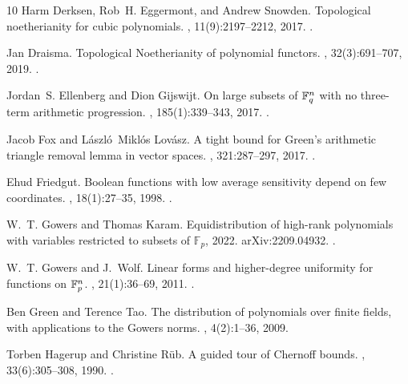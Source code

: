 \begin{thebibliography}{10}
Harm Derksen, Rob~H. Eggermont, and Andrew Snowden.
\newblock Topological noetherianity for cubic polynomials.
, 11(9):2197--2212, 2017.
\newblock \href {https://doi.org/10.2140/ant.2017.11.2197} {}.

Jan Draisma.
\newblock Topological {N}oetherianity of polynomial functors.
, 32(3):691--707, 2019.
\newblock \href {https://doi.org/10.1090/jams/923} {}.

Jordan~S. Ellenberg and Dion Gijswijt.
\newblock On large subsets of {$\Bbb F^n_q$} with no three-term arithmetic progression.
, 185(1):339--343, 2017.
\newblock \href {https://doi.org/10.4007/annals.2017.185.1.8} {}.

Jacob Fox and L\'{a}szl\'{o}~Mikl\'{o}s Lov\'{a}sz.
\newblock A tight bound for {G}reen's arithmetic triangle removal lemma in vector spaces.
, 321:287--297, 2017.
\newblock \href {https://doi.org/10.1016/j.aim.2017.09.037} {}.

Ehud Friedgut.
\newblock Boolean functions with low average sensitivity depend on few coordinates.
, 18(1):27--35, 1998.
\newblock \href {https://doi.org/10.1007/PL00009809} {}.

W.~T. Gowers and Thomas Karam.
\newblock Equidistribution of high-rank polynomials with variables restricted to subsets of $\mathbb{F}_p$, 2022.
\newblock arXiv:2209.04932.
\newblock \href {https://doi.org/10.48550/ARXIV.2209.04932} {}.

W.~T. Gowers and J.~Wolf.
\newblock Linear forms and higher-degree uniformity for functions on {$\Bbb F^n_p$}.
, 21(1):36--69, 2011.
\newblock \href {https://doi.org/10.1007/s00039-010-0106-3} {}.

Ben Green and Terence Tao.
\newblock The distribution of polynomials over finite fields, with applications to the {G}owers norms.
, 4(2):1--36, 2009.

Torben Hagerup and Christine R{\"u}b.
\newblock A guided tour of {Chernoff} bounds.
, 33(6):305--308, 1990.
\newblock \href {https://doi.org/10.1016/0020-0190(90)90214-I} {}.


\end{thebibliography}
